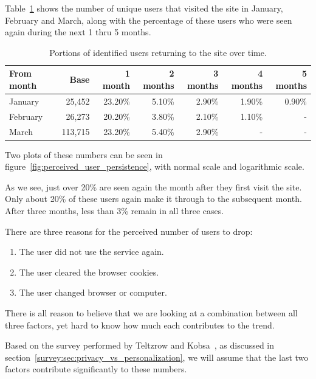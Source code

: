 Table~\ref{tab:returning_users} shows the number of unique users that visited the site in January, February and March, along with the percentage of these users who were seen again during the next 1 thru 5 months.

\begin{table}[h]
  \begin{tabular}{|l|r|rrrrr|}
    \hline
    From month & Base    & 1 month & 2 months & 3 months & 4 months & 5 months \\ \hline
    January    & 25,452  & 23.20\% & 5.10\%   & 2.90\%   & 1.90\%   & 0.90\%   \\
    February   & 26,273  & 20.20\% & 3.80\%   & 2.10\%   & 1.10\%   & -        \\
    March      & 113,715 & 23.20\% & 5.40\%   & 2.90\%   & -        & -        \\ \hline
  \end{tabular}
  \caption{Portions of identified users returning to the site over time.}
  \label{tab:returning_users}
\end{table}

Two plots of these numbers can be seen in figure~\ref{fig:perceived_user_persistence}, with normal scale and logarithmic scale.

As we see, just over 20\% are seen again the month after they first visit the site. Only about 20\% of these users again make it through to the subsequent month. After three months, less than 3\% remain in all three cases.

There are three reasons for the perceived number of users to drop:

\begin{enumerate}
  \item The user did not use the service again.
  \item The user cleared the browser cookies.
  \item The user changed browser or computer.
\end{enumerate}

There is all reason to believe that we are looking at a combination between all three factors, yet hard to know how much each contributes to the trend.

Based on the survey performed by Teltzrow and Kobsa~\cite{Teltzrow2004}, as discussed in section~\ref{survey:sec:privacy_vs_personalization}, we will assume that the last two factors contribute significantly to these numbers.


